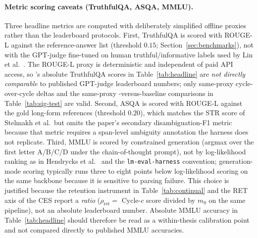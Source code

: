 \paragraph{Metric scoring caveats (TruthfulQA, ASQA, MMLU).}
\label{sec:metric-scoring-caveats}
Three headline metrics are computed with deliberately simplified offline proxies rather than the leaderboard protocols. First, TruthfulQA is scored with ROUGE-L against the reference-answer list (threshold $0.15$; Section~\ref{sec:benchmarks}), not with the GPT-judge fine-tuned on human truthful/informative labels used by Lin et al.~\cite{lin-etal-2022-truthfulqa}. The ROUGE-L proxy is deterministic and independent of paid API access, so \caem{}'s absolute TruthfulQA scores in Table~\ref{tab:headline} are \emph{not directly comparable} to published GPT-judge leaderboard numbers; only same-proxy cycle-over-cycle deltas and the same-proxy \caem{}-versus-baseline comparisons in Table~\ref{tab:sig-test} are valid. Second, ASQA is scored with ROUGE-L against the gold long-form references (threshold $0.20$), which matches the STR score of Stelmakh et al.\ but omits the paper's secondary disambiguation-F1 metric because that metric requires a span-level ambiguity annotation the harness does not replicate. Third, MMLU is scored by constrained generation (argmax over the first letter A/B/C/D under the chain-of-thought prompt), not by log-likelihood ranking as in Hendrycks et al.~\cite{hendrycks2021measuring} and the \texttt{lm-eval-harness} convention; generation-mode scoring typically runs three to eight points below log-likelihood scoring on the same backbone because it is sensitive to parsing failure. This choice is justified because the retention instrument in Table~\ref{tab:continual} and the RET axis of the CES report a \emph{ratio} ($\rho_{\text{ret}} = $ Cycle-$c$ score divided by $m_{0}$ on the same pipeline), not an absolute leaderboard number. Absolute MMLU accuracy in Table~\ref{tab:headline} should therefore be read as a within-thesis calibration point and not compared directly to published MMLU accuracies.

